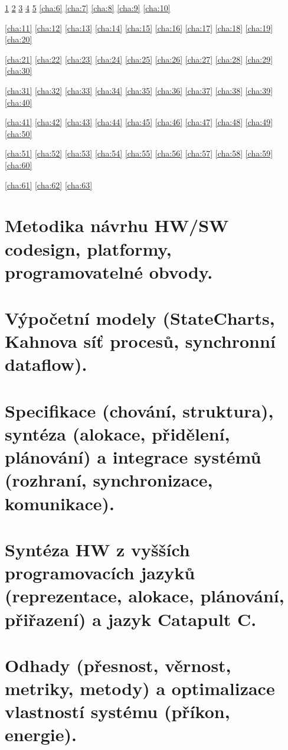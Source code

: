 \documentclass[a4paper, 11pt]{report}
\begin{document}
\ref{cha:1}
\ref{cha:2}
\ref{cha:3}
\ref{cha:4}
\ref{cha:5}
\ref{cha:6}
\ref{cha:7}
\ref{cha:8}
\ref{cha:9}
\ref{cha:10}

\ref{cha:11}
\ref{cha:12}
\ref{cha:13}
\ref{cha:14}
\ref{cha:15}
\ref{cha:16}
\ref{cha:17}
\ref{cha:18}
\ref{cha:19}
\ref{cha:20}

\ref{cha:21}
\ref{cha:22}
\ref{cha:23}
\ref{cha:24}
\ref{cha:25}
\ref{cha:26}
\ref{cha:27}
\ref{cha:28}
\ref{cha:29}
\ref{cha:30}

\ref{cha:31}
\ref{cha:32}
\ref{cha:33}
\ref{cha:34}
\ref{cha:35}
\ref{cha:36}
\ref{cha:37}
\ref{cha:38}
\ref{cha:39}
\ref{cha:40}

\ref{cha:41}
\ref{cha:42}
\ref{cha:43}
\ref{cha:44}
\ref{cha:45}
\ref{cha:46}
\ref{cha:47}
\ref{cha:48}
\ref{cha:49}
\ref{cha:50}

\ref{cha:51}
\ref{cha:52}
\ref{cha:53}
\ref{cha:54}
\ref{cha:55}
\ref{cha:56}
\ref{cha:57}
\ref{cha:58}
\ref{cha:59}
\ref{cha:60}

\ref{cha:61}
\ref{cha:62}
\ref{cha:63}
\newpage

\tableofcontents

\chapter{Metodika návrhu HW/SW codesign, platformy, programovatelné obvody.} \label{cha:1}
\chapter{Výpočetní modely (StateCharts, Kahnova síť procesů, synchronní dataflow).} \label{cha:2}
\chapter{Specifikace (chování, struktura), syntéza (alokace, přidělení, plánování) a integrace systémů (rozhraní, synchronizace, komunikace).} \label{cha:3}
\chapter{Syntéza HW z vyšších programovacích jazyků (reprezentace, alokace, plánování, přiřazení) a jazyk Catapult C.} \label{cha:4}
\chapter{Odhady (přesnost, věrnost, metriky, metody) a optimalizace vlastností systému (příkon, energie).} \label{cha:5}
\end{document}
